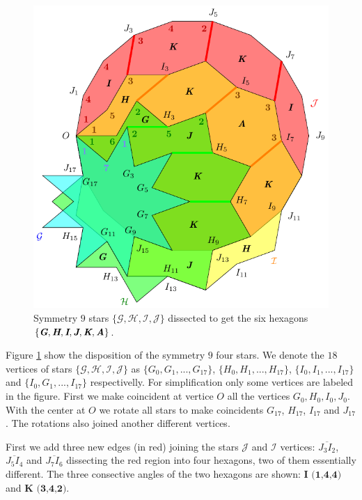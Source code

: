 \documentclass[11pt]{article}
\def\mathbi#1{\textbf{\em #1}}
\begin{document}
\begin{figure}[h]
\centering
\includegraphics[scale=1]{hexagons-9}
\caption{Symmetry $9$ stars $\{\mathcal{G},\mathcal{H},\mathcal{I},\mathcal{J}\}$
 dissected to get the six hexagons
$\{\mathbi{G},\mathbi{H},\mathbi{I},\mathbi{J},\mathbi{K},\mathbi{A}\}$.
}
\label{fig:hexagons-9}
\end{figure}

Figure \ref{fig:hexagons-9} show the disposition of the symmetry $9$ four stars. We denote the $18$ vertices of stars $\{\mathcal{G},\mathcal{H},\mathcal{I},\mathcal{J}\}$ as
 $\{G_0,G_1,...,G_{17}\}$,
 $\{H_0,H_1,...,H_{17}\}$,
 $\{I_0,I_1,...,I_{17}\}$ and
 $\{I_0,G_1,...,I_{17}\}$ respectivelly. 
For simplification only some vertices are labeled in the figure. First we make coincident at vertice $O$ all the vertices $G_0,H_0,I_0,J_0$. With the center at $O$ we rotate all stars to make coincidents
$G_{17}$, $H_{17}$, $I_{17}$ and $J_{17}$. The rotations also joined another different vertices.

First we add three new edges (in red) joining the stars $\mathcal{J}$ and $\mathcal{I}$ vertices: $\overline{J_3I_2}$, $\overline{J_5I_4}$ and $\overline{J_7I_6}$ dissecting the red region into four hexagons, two of them essentially different. The three consective angles of the two hexagons are shown: $\textbf{I (1,4,4)}$ and $\textbf{K (3,4,2)}$.
\end{document}
